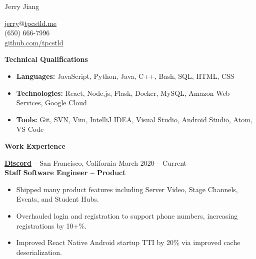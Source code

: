 \documentclass{letter}
\begin{document}
  \thispagestyle{empty}

\begin{bfseries}
\begin{minipage}{0.5\textwidth}
{\Huge Jerry Jiang}
\end{minipage}
\begin{minipage}{\dimexpr 0.5\textwidth-2pt}
  \vspace{2mm}
  \null \hfill {\href{mailto:jerry@tpcstld.me}{\uline{jerry}}@\href{http://tpcstld.me}{\uline{tpcstld.me}} \\
  \null \hfill (650) 666-7996 \\
  \null \hfill \href{https://github.com/tpcstld}{\uline{github.com/tpcstld}}}
\end{minipage}
\end{bfseries}

{\bfseries \Large Technical Qualifications}

\vspace{-10mm}
\null\hrulefill

\vspace{-3mm}
\begin{itemize}
    \item {\bfseries Languages:}
        JavaScript, Python, Java, C++, Bash, SQL, HTML, CSS
    \item {\bfseries Technologies:}
        React, Node.js, Flask, Docker, MySQL, Amazon Web Services, Google Cloud
    \item {\bfseries Tools:}
        Git, SVN, Vim, IntelliJ IDEA, Visual Studio, Android Studio, Atom, VS
        Code
\end{itemize}

{\bfseries \Large Work Experience}

\vspace{-10mm}
\null\hrulefill

\vspace{-1.5mm}
{\bfseries \href{https://discord.com}{\uline{Discord}}} -- San Francisco,
California \hfill March 2020 -- Current \\
{\bfseries Staff Software Engineer -- Product}
\vspace{-3mm}
\begin{itemize}
  \item Shipped many product features including Server Video, Stage Channels, Events, and Student Hubs.
  \item Overhauled login and registration to support phone numbers, increasing registrations by 10+\%.
  \item Improved React Native Android startup TTI by 20\% via improved cache deserialization.
\end{itemize}
\end{document}
